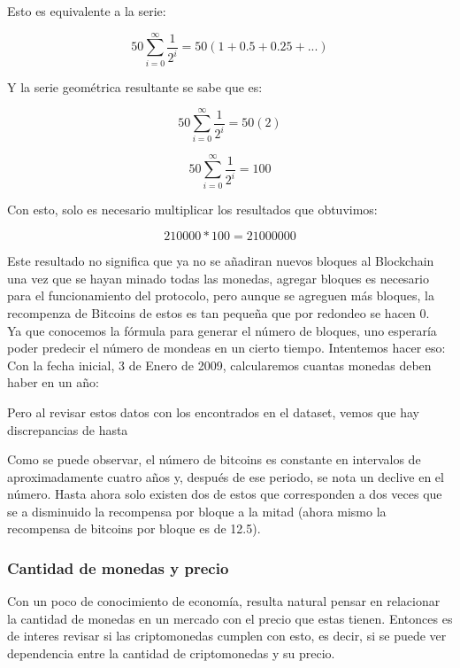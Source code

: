 \documentclass[12pt,letterpaper]{article}
\begin{document}
    Esto es equivalente a la serie:

    $$ 50 \sum_{i = 0}^{\infty} \frac{1}{2^{i}} = 50 (1 + 0.5 + 0.25 + ...) $$

    Y la serie geom\'etrica resultante se sabe que es:

    $$ 50 \sum_{i = 0}^{\infty} \frac{1}{2^{i}} = 50 (2) $$

    $$ 50 \sum_{i = 0}^{\infty} \frac{1}{2^{i}} = 100 $$

    Con esto, solo es necesario multiplicar los resultados que obtuvimos:

    $$ 210000 * 100 = 21000000 $$

    Este resultado no significa que ya no se a\~nadiran nuevos bloques al Blockchain una vez que se hayan minado todas las monedas, agregar bloques es necesario para el funcionamiento del protocolo, pero aunque se agreguen m\'as bloques, la recompenza de Bitcoins de estos es tan peque\~na que por redondeo se hacen 0.
    \\

    Ya que conocemos la f\'ormula para generar el n\'umero de bloques, uno esperar\'ia poder predecir el n\'umero de mondeas en un cierto tiempo. Intentemos hacer eso:
    \\
    Con la fecha inicial, 3 de Enero de 2009, calcularemos cuantas monedas deben haber en un a\~no:



    Pero al revisar estos datos con los encontrados en el dataset, vemos que hay discrepancias de hasta %



    Como se puede observar, el n\'umero de bitcoins es constante en intervalos de aproximadamente cuatro a\~nos y, despu\'es de ese periodo, se nota un declive en el n\'umero. Hasta ahora solo existen dos de estos que corresponden a dos veces que se a disminuido la recompensa por bloque a la mitad (ahora mismo la recompensa de bitcoins por bloque es de 12.5).


    \subsubsection*{Cantidad de monedas y precio}

    Con un poco de conocimiento de economía, resulta natural pensar en relacionar la cantidad de monedas en un mercado con el precio que estas tienen. Entonces es de interes revisar si las criptomonedas cumplen con esto, es decir, si se puede ver dependencia entre la cantidad de criptomonedas y su precio.
\end{document}
